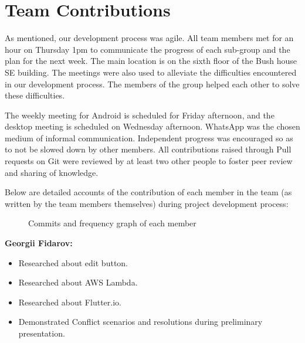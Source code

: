 \section{Team Contributions}

As mentioned, our development process was agile. All team members met for an hour on Thursday 1pm to communicate the progress of each sub-group and the plan for the next week. The main location is on the sixth floor of the Bush house SE building.   The meetings were also used to alleviate the difficulties encountered in our development process. The members of the group helped each other to solve these difficulties.\newline

The weekly meeting for Android is scheduled for Friday afternoon, and the desktop meeting is scheduled on Wednesday afternoon. WhatsApp was the chosen medium of informal communication. Independent progress was encouraged so as to not be slowed down by other members. All contributions raised through Pull requests on Git were reviewed by at least two other people to foster peer review and sharing of knowledge.\newline

Below are detailed accounts of the contribution of each member in the team (as written by the team members themselves) during project development process:\newline


\begin{figure}[ht]
\centering

%

\end{figure}

\begin{figure}[H]
\centering

%

\caption{Commits and frequency graph of each member}

\end{figure}


\textbf{Georgii Fidarov:}
\begin{itemize}
\item Researched about edit button.
\item Researched about AWS Lambda.
\item Researched about Flutter.io.
\item Demonstrated Conflict scenarios and resolutions during preliminary presentation.
\end{itemize}

